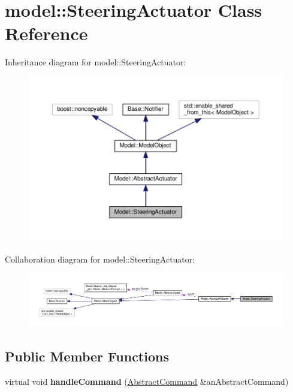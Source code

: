 \hypertarget{class_model_1_1_steering_actuator}{}\section{model\+:\+:Steering\+Actuator Class Reference}
\label{class_model_1_1_steering_actuator}


Inheritance diagram for model\+:\+:Steering\+Actuator\+:
\nopagebreak
\begin{figure}[H]
\begin{center}
\leavevmode
\includegraphics[width=350pt]{class_model_1_1_steering_actuator__inherit__graph}
\end{center}
\end{figure}


Collaboration diagram for model\+:\+:Steering\+Actuator\+:
\nopagebreak
\begin{figure}[H]
\begin{center}
\leavevmode
\includegraphics[width=350pt]{class_model_1_1_steering_actuator__coll__graph}
\end{center}
\end{figure}
\subsection*{Public Member Functions}
\begin{DoxyCompactItemize}
\item 
virtual void {\bfseries handle\+Command} (\hyperlink{class_model_1_1_abstract_command}{Abstract\+Command} \&an\+Abstract\+Command)\hypertarget{class_model_1_1_steering_actuator_a24503627c8e960eb7206e785906f3ac4}{}\label{class_model_1_1_steering_actuator_a24503627c8e960eb7206e785906f3ac4}

\end{DoxyCompactItemize}
